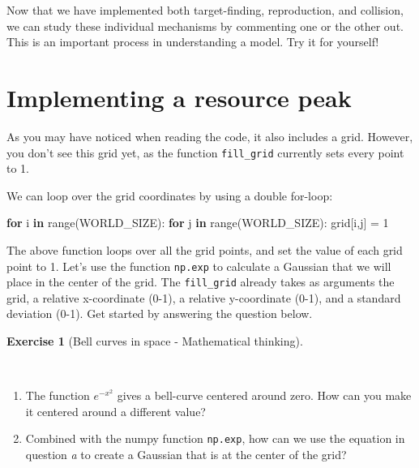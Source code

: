 \documentclass[
  letterpaper,
  DIV=11,
  numbers=noendperiod]{scrreprt}
\newenvironment{Shaded}{\begin{snugshade}}{\end{snugshade}}
\newcommand{\BuiltInTok}[1]{\textcolor[rgb]{0.00,0.23,0.31}{#1}}
\newcommand{\ControlFlowTok}[1]{\textcolor[rgb]{0.00,0.23,0.31}{\textbf{#1}}}
\newcommand{\DecValTok}[1]{\textcolor[rgb]{0.68,0.00,0.00}{#1}}
\newcommand{\KeywordTok}[1]{\textcolor[rgb]{0.00,0.23,0.31}{\textbf{#1}}}
\newcommand{\NormalTok}[1]{\textcolor[rgb]{0.00,0.23,0.31}{#1}}
\newcommand{\OperatorTok}[1]{\textcolor[rgb]{0.37,0.37,0.37}{#1}}
\providecommand{\tightlist}{%
  \setlength{\itemsep}{0pt}\setlength{\parskip}{0pt}}\usepackage{longtable,booktabs,array}
\theoremstyle{definition}
\newtheorem{exercise}{Exercise}[chapter]
\theoremstyle{remark}
\begin{document}
Now that we have implemented both target-finding, reproduction, and
collision, we can study these individual mechanisms by commenting one or
the other out. This is an important process in understanding a model.
Try it for yourself!

\section{Implementing a resource peak}\label{sec-resourcepeak}

As you may have noticed when reading the code, it also includes a grid.
However, you don't see this grid yet, as the function
\texttt{fill\_grid} currently sets every point to 1.

We can loop over the grid coordinates by using a double for-loop:

\begin{Shaded}
\begin{Highlighting}[]
\ControlFlowTok{for}\NormalTok{ i }\KeywordTok{in} \BuiltInTok{range}\NormalTok{(WORLD\_SIZE):}
  \ControlFlowTok{for}\NormalTok{ j }\KeywordTok{in} \BuiltInTok{range}\NormalTok{(WORLD\_SIZE):}
\NormalTok{    grid[i,j] }\OperatorTok{=} \DecValTok{1}
\end{Highlighting}
\end{Shaded}

The above function loops over all the grid points, and set the value of
each grid point to 1. Let's use the function \texttt{np.exp} to
calculate a Gaussian that we will place in the center of the grid. The
\texttt{fill\_grid} already takes as arguments the grid, a relative
x-coordinate (0-1), a relative y-coordinate (0-1), and a standard
deviation (0-1). Get started by answering the question below.

\begin{exercise}[Bell curves in space - Mathematical
thinking]\protect\hypertarget{exr-steering}{}\label{exr-steering}

~

\begin{enumerate}
\def\labelenumi{\alph{enumi}.}
\tightlist
\item
  The function \(e^{-x^2}\) gives a bell-curve centered around zero. How
  can you make it centered around a different value?
\item
  Combined with the numpy function \texttt{np.exp}, how can we use the
  equation in question \emph{a} to create a Gaussian that is at the
  center of the grid?
\end{enumerate}

\end{exercise}
\end{document}
